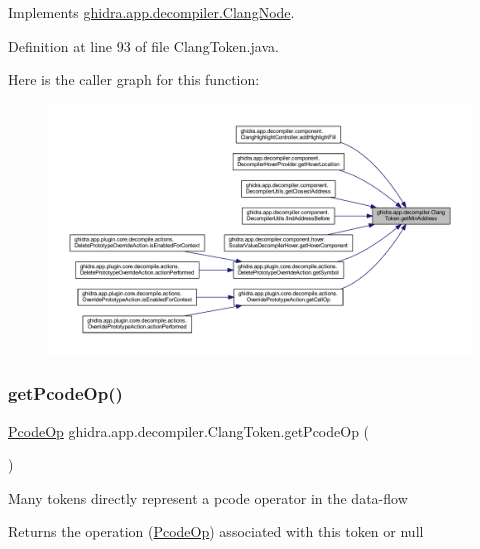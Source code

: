 Implements \mbox{\hyperlink{interfaceghidra_1_1app_1_1decompiler_1_1_clang_node_a28f86ac40636cd77392e26367db69dc3}{ghidra.\+app.\+decompiler.\+Clang\+Node}}.



Definition at line 93 of file Clang\+Token.\+java.

Here is the caller graph for this function\+:
\nopagebreak
\begin{figure}[H]
\begin{center}
\leavevmode
\includegraphics[width=350pt]{classghidra_1_1app_1_1decompiler_1_1_clang_token_ad29a43e8aae3a2250fcb8632a4010993_icgraph}
\end{center}
\end{figure}
\mbox{\label{classghidra_1_1app_1_1decompiler_1_1_clang_token_a96d9143747ec664bf622560d80367455}} 
\subsubsection{\texorpdfstring{getPcodeOp()}{getPcodeOp()}}
{\footnotesize\ttfamily \mbox{\hyperlink{class_pcode_op}{Pcode\+Op}} ghidra.\+app.\+decompiler.\+Clang\+Token.\+get\+Pcode\+Op (\begin{DoxyParamCaption}{ }\end{DoxyParamCaption})\hspace{0.3cm}{\ttfamily [inline]}}

Many tokens directly represent a pcode operator in the data-\/flow \begin{DoxyReturn}{Returns}
the operation (\mbox{\hyperlink{class_pcode_op}{Pcode\+Op}}) associated with this token or null 
\end{DoxyReturn}


